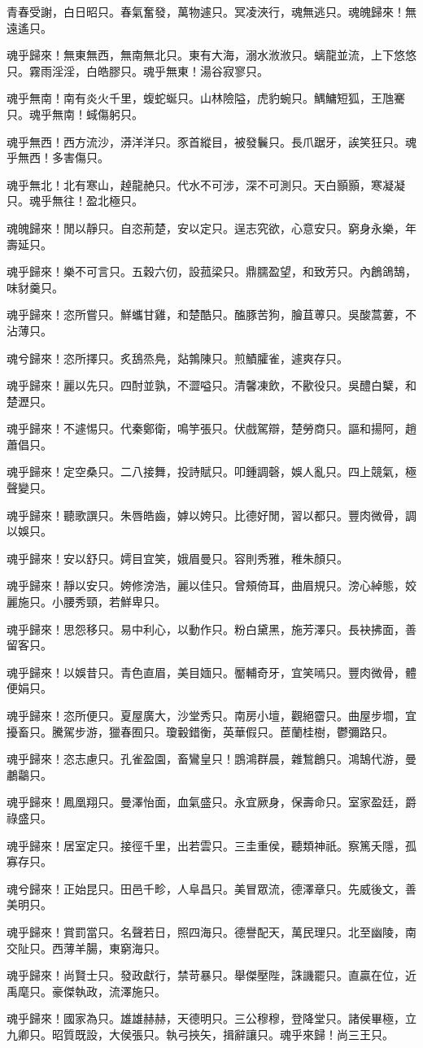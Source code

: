 
\begin{pinyinscope}
青春受謝，白日昭只。春氣奮發，萬物遽只。冥凌浹行，魂無逃只。魂魄歸來！無遠遙只。

魂乎歸來！無東無西，無南無北只。東有大海，溺水浟浟只。螭龍並流，上下悠悠只。霧雨淫淫，白皓膠只。魂乎無東！湯谷寂寥只。

魂乎無南！南有炎火千里，蝮蛇蜒只。山林險隘，虎豹蜿只。鰅鱅短狐，王虺騫只。魂乎無南！蜮傷躬只。

魂乎無西！西方流沙，漭洋洋只。豕首縱目，被發鬤只。長爪踞牙，誒笑狂只。魂乎無西！多害傷只。

魂乎無北！北有寒山，趠龍赩只。代水不可涉，深不可測只。天白顥顥，寒凝凝只。魂乎無往！盈北極只。

魂魄歸來！閒以靜只。自恣荊楚，安以定只。逞志究欲，心意安只。窮身永樂，年壽延只。

魂乎歸來！樂不可言只。五穀六仞，設菰梁只。鼎臑盈望，和致芳只。內鶬鴿鵠，味豺羹只。

魂乎歸來！恣所嘗只。鮮蠵甘雞，和楚酷只。醢豚苦狗，膾苴蒪只。吳酸蒿蔞，不沾薄只。

魂兮歸來！恣所擇只。炙鴰烝鳧，煔鶉陳只。煎鰿臛雀，遽爽存只。

魂乎歸來！麗以先只。四酎並孰，不澀嗌只。清馨凍飲，不歠役只。吳醴白櫱，和楚瀝只。

魂乎歸來！不遽惕只。代秦鄭衛，鳴竽張只。伏戲駕辯，楚勞商只。謳和揚阿，趙蕭倡只。

魂乎歸來！定空桑只。二八接舞，投詩賦只。叩鍾調磬，娛人亂只。四上競氣，極聲變只。

魂乎歸來！聽歌譔只。朱唇皓齒，嫭以姱只。比德好閒，習以都只。豐肉微骨，調以娛只。

魂乎歸來！安以舒只。嫮目宜笑，娥眉曼只。容則秀雅，稚朱顏只。

魂乎歸來！靜以安只。姱修滂浩，麗以佳只。曾頰倚耳，曲眉規只。滂心綽態，姣麗施只。小腰秀頸，若鮮卑只。

魂乎歸來！思怨移只。易中利心，以動作只。粉白黛黑，施芳澤只。長袂拂面，善留客只。

魂乎歸來！以娛昔只。青色直眉，美目媔只。靨輔奇牙，宜笑嘕只。豐肉微骨，體便娟只。

魂乎歸來！恣所便只。夏屋廣大，沙堂秀只。南房小壇，觀絕霤只。曲屋步壛，宜擾畜只。騰駕步游，獵春囿只。瓊轂錯衡，英華假只。茞蘭桂樹，鬱彌路只。

魂乎歸來！恣志慮只。孔雀盈園，畜鸞皇只！鵾鴻群晨，雜鶖鶬只。鴻鵠代游，曼鷫鸘只。

魂乎歸來！鳳凰翔只。曼澤怡面，血氣盛只。永宜厥身，保壽命只。室家盈廷，爵祿盛只。

魂乎歸來！居室定只。接徑千里，出若雲只。三圭重侯，聽類神祇。察篤夭隱，孤寡存只。

魂兮歸來！正始昆只。田邑千畛，人阜昌只。美冒眾流，德澤章只。先威後文，善美明只。

魂乎歸來！賞罰當只。名聲若日，照四海只。德譽配天，萬民理只。北至幽陵，南交阯只。西薄羊腸，東窮海只。

魂乎歸來！尚賢士只。發政獻行，禁苛暴只。舉傑壓陛，誅譏罷只。直贏在位，近禹麾只。豪傑執政，流澤施只。

魂乎歸來！國家為只。雄雄赫赫，天德明只。三公穆穆，登降堂只。諸侯畢極，立九卿只。昭質既設，大侯張只。執弓挾矢，揖辭讓只。魂乎來歸！尚三王只。


\end{pinyinscope}